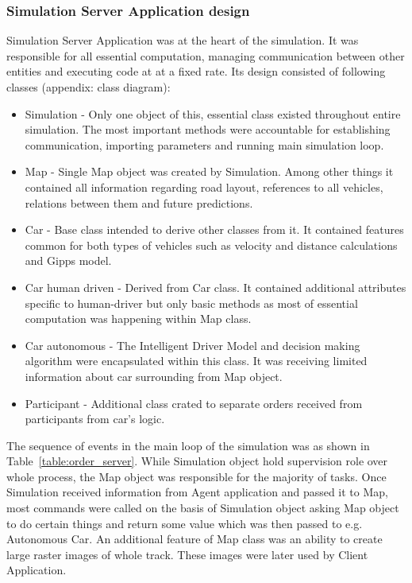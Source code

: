 \documentclass[11pt,english]{article}
\begin{document}
\subsubsection{Simulation Server Application design}


Simulation Server Application was at the heart of the simulation. It was responsible for all essential computation, managing communication between other entities and executing code at at a fixed rate. Its design consisted of following classes (appendix: class diagram):

\begin{itemize}
\item Simulation - Only one object of this, essential class existed throughout entire simulation. The most important methods were accountable for establishing communication, importing parameters and running main simulation loop.
\item Map - Single Map object was created by Simulation. Among other things it contained all information regarding road layout, references to all vehicles, relations between them and future predictions. 
\item Car - Base class intended to derive other classes from it. It contained features common for both types of vehicles such as velocity and distance calculations and Gipps model.
\item Car human driven - Derived from Car class. It contained additional attributes specific to human-driver but only basic methods as most of essential computation was happening within Map class.
\item Car autonomous - The Intelligent Driver Model and decision making algorithm were encapsulated within this class. It was receiving limited information about car surrounding from Map object.
\item Participant - Additional class crated to separate orders received from participants from car's logic.
\end{itemize}


The sequence of events in the main loop of the simulation was as shown in Table~\ref{table:order_server}. While Simulation object hold supervision role over whole process, the Map object was responsible for the majority of tasks. Once Simulation received information from Agent application and passed it to Map, most commands were called on the basis of Simulation object asking Map object to do certain things and return some value which was then passed to e.g. Autonomous Car. 
An additional feature of Map class was an ability to create large raster images of whole track. These images were later used by Client Application.
\end{document}
